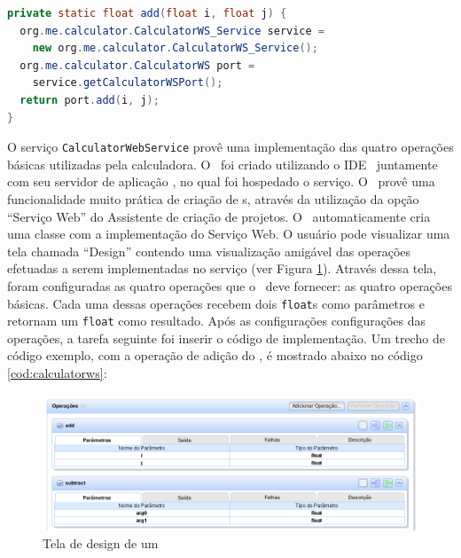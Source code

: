 \begin{lstlisting}[float,caption=Operação de chamada ao WebService,label=cod:add,language=Java]
private static float add(float i, float j) {
  org.me.calculator.CalculatorWS_Service service = 
    new org.me.calculator.CalculatorWS_Service();
  org.me.calculator.CalculatorWS port = 
    service.getCalculatorWSPort();
  return port.add(i, j);
}
\end{lstlisting}


O serviço \texttt{CalculatorWebService} provê uma implementação das quatro
operações básicas utilizadas pela calculadora. O \WebService\ foi criado utilizando o IDE
\NetBeans\ juntamente com seu servidor de aplicação \Glassfish, no qual foi hospedado o
serviço. O \NetBeans\ provê uma funcionalidade muito prática de criação de
\WebService s, através da utilização da opção ``Serviço Web'' do Assistente de criação de
projetos. O \NetBeans\ automaticamente cria uma classe com a implementação do
Serviço Web. O usuário pode visualizar uma tela chamada 
``Design'' contendo uma visualização amigável das operações efetuadas a serem
implementadas no serviço (ver Figura \ref{fig:arquitetura:design}). Através
dessa tela, foram configuradas as quatro operações que o \WebService\ deve
fornecer: as quatro operações básicas. Cada uma dessas operações recebem dois
\texttt{float}s como parâmetros e retornam um \texttt{float} como resultado.
Após as configurações configurações das operações, a tarefa seguinte foi inserir
o código de implementação. Um trecho de código exemplo, com a operação de adição
do \WebService, é mostrado abaixo no código \ref{cod:calculatorws}:



\begin{figure}[htb]
  \centering
  \includegraphics[width=\textwidth]{imgs/webservice-design}
  \caption{Tela de design de um \WebService}
  \label{fig:arquitetura:design}
\end{figure}


